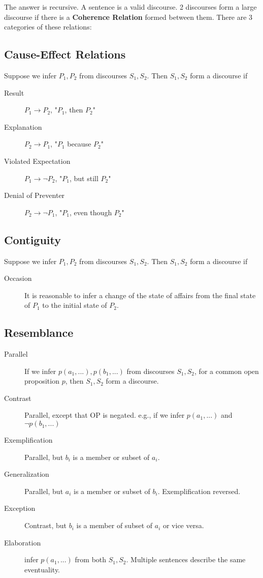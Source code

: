 \documentclass[11pt]{article}
\begin{document}
The answer is recursive. A sentence is a valid discourse. 2 discourses form a large discourse if 
there is a \textbf{Coherence Relation} formed between them. There are 3 categories of these
relations:


\subsection{Cause-Effect Relations}
Suppose we infer $P_1, P_2$ from discourses $S_1, S_2$. Then $S_1, S_2$ form a discourse if
\begin{description}
    \item[Result] $P_1 \rightarrow P_2$, "$P_1$, then $P_2$"
    \item[Explanation] $P_2 \rightarrow P_1$, "$P_1$ because $P_2$"
    \item[Violated Expectation] $P_1 \rightarrow \neg P_2$, "$P_1$, but still $P_2$"
    \item[Denial of Preventer] $P_2 \rightarrow \neg P_1$, "$P_1$, even though $P_2$"
\end{description}

\subsection{Contiguity}
Suppose we infer $P_1, P_2$ from discourses $S_1, S_2$. Then $S_1, S_2$ form a discourse if
\begin{description}
    \item[Occasion] It is reasonable to infer a change of the state of affairs from the final
        state of $P_1$ to the initial state of $P_2$.
\end{description}

\subsection{Resemblance}
\begin{description}
    \item[Parallel] If we infer $p(a_1,...), p(b_1,...)$ from discourses $S_1, S_2$, for a common
        open proposition $p$, then $S_1, S_2$ form a discourse.
    \item[Contrast] Parallel, except that OP is negated. e.g., if we infer $p(a_1,...)$ and $\neg p(b_1,...)$
    \item[Exemplification] Parallel, but $b_i$ is a member or subset of $a_i$. 
    \item[Generalization] Parallel, but $a_i$ is a member or subset of $b_i$. Exemplification reversed.
    \item[Exception] Contrast, but $b_i$ is a member of subset of $a_i$ or vice versa.
    \item[Elaboration] infer $p(a_1,...)$ from both $S_1, S_2$. Multiple sentences describe the same 
        eventuality.
\end{description}
\end{document}
